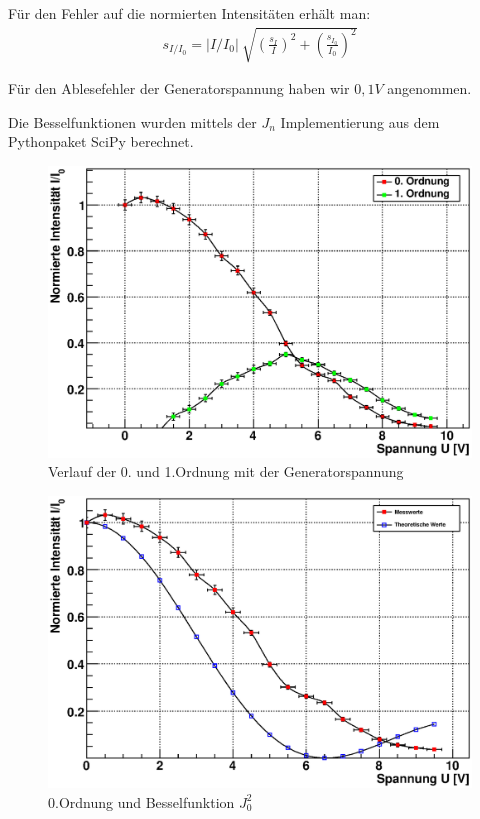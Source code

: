 \documentclass[12pt]{article}
\begin{document}
Für den Fehler auf die normierten Intensitäten erhält man:
\begin{align}
 s_{I/I_0} = \lvert I/I_0 \rvert ~ \sqrt{\left(\frac{s_I}{I}\right)^2 + \left(\frac{s_{I_0}}{I_0}\right)^2}
\end{align}

Für den Ablesefehler der Generatorspannung haben wir $0,1V$ angenommen.

Die Besselfunktionen wurden mittels der $J_n$ Implementierung aus dem Pythonpaket SciPy berechnet.

\begin{figure}[H]  
\centering
\includegraphics[width=0.9\linewidth]{pictures/raman0+1o.eps}
\caption{Verlauf der 0. und 1.Ordnung mit der Generatorspannung}
\end{figure}

\begin{figure}[H]  
\centering
\includegraphics[width=0.9\linewidth]{pictures/raman0o.eps}
\caption{0.Ordnung und Besselfunktion $J^2_0$}
\end{figure}
\end{document}
